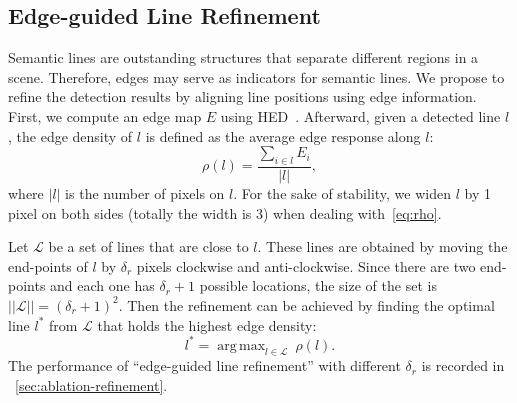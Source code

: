 \documentclass[10pt,journal,cspaper,compsoc]{IEEEtran}
\DeclareMathOperator*{\argmax}{arg\,max}
\begin{document}
\subsection{Edge-guided Line Refinement}\label{sec:refine} 
Semantic lines are outstanding structures that
separate different regions in a scene.
Therefore, edges may serve as indicators for semantic lines.
We propose to refine the detection results by aligning line positions using
edge information.
First, we compute an edge map $E$ using HED~\cite{xie2015holistically}.
Afterward, given a detected line $l$, the edge density of $l$ is defined as the average
edge response along $l$:
\begin{equation}
\rho(l) = \frac{\sum_{i\in l} E_i}{|l|},
\label{eq:rho}
\end{equation}
where $|l|$ is the number of pixels on $l$.
For the sake of stability, we widen $l$ by 1 pixel on both sides (totally the width is 3)
when dealing with~\cref{eq:rho}.

Let $\mathcal{L}$ be a set of lines that are close to $l$.
These lines are obtained by moving the end-points of $l$ by $\delta_r$ pixels clockwise
and anti-clockwise.
Since there are two end-points and each one has
$\delta_r+1$ possible locations, the size of the set is $||\mathcal{L}|| = (\delta_r+1)^2$.
Then the refinement can be achieved by finding the optimal line $l^*$ from $\mathcal{L}$
that holds the highest edge density:
\begin{equation}
  l^* = \argmax_{l\in\mathcal{L}} \ \rho(l).\label{eq:refine-search}
\end{equation}
The performance of ``edge-guided line refinement'' with different $\delta_r$
is recorded in ~\cref{sec:ablation-refinement}.
\end{document}
